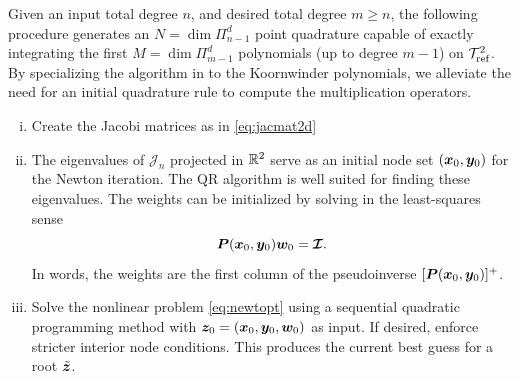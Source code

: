Given an input total degree $n$, and desired total degree $m \geq n$, the following procedure generates an $N = \dim\Pi_{n-1}^d$ point quadrature capable of exactly integrating the first $M = \dim\Pi_{m-1}^d$ polynomials (up to degree $m-1$) on $\mathcal{T}_{\text{ref}}^2$. By specializing the algorithm in \cite{vrquad} to the Koornwinder polynomials, we alleviate the need for an initial quadrature rule to compute the multiplication operators.
\noindent
\begin{enumerate}[(i)]
\item Create the Jacobi matrices as in \eqref{eq:jacmat2d}
\item The eigenvalues of $\mathcal{J}_n$ projected in $\mathbb{R}^2$ serve as an initial node set $(\boldsymbol{x}_0,\boldsymbol{y}_0)$ for the Newton iteration. The QR algorithm is well suited for finding these eigenvalues. The weights can be initialized by solving in the least-squares sense $$\boldsymbol{P}(\boldsymbol{x}_0,\boldsymbol{y}_0)\boldsymbol{w}_0 = \boldsymbol{\mathcal{I}}.$$
In words, the weights are the first column of the pseudoinverse $[\boldsymbol{P}(\boldsymbol{x}_0,\boldsymbol{y}_0)]^+$.
\item Solve the nonlinear problem \eqref{eq:newtopt} using a sequential quadratic programming method with $\boldsymbol{z}_0 = (\boldsymbol{x}_0,\boldsymbol{y}_0,\boldsymbol{w}_0)$ as input. If desired, enforce stricter interior node conditions. This produces the current best guess for a root $\tilde{\boldsymbol{z}}$. 

\end{enumerate}
